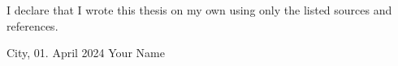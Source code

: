 I declare that I wrote this thesis on my own using only the listed sources and references.
\vspace{2cm}

City, 01. April 2024 \hspace{2cm} Your Name